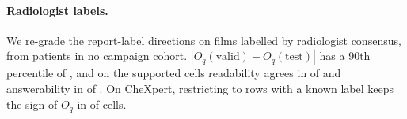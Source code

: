 \documentclass{article}
\begin{document}
\begin{table}[h]
\centering
\setlength{\tabcolsep}{3pt}
\caption{\textbf{The full grade under refitted probes.} Cells per seed-0 grade (owned, stronger competitor, unresolved, fixed-family advantage without the reference) and how many keep it under both refits, one, or none.}
\label{tab:cf-refit}
\end{table}

\paragraph{Radiologist labels.} We re-grade the report-label directions on \cfValidRows{} films labelled by radiologist consensus, from patients in no campaign cohort. $|O_q(\text{valid})-O_q(\text{test})|$ has a 90th percentile of \cfValidNinetyDO{}, and on the \cfValidSupported{} supported cells readability agrees in \cfValidReadableAgree{} of \cfValidReadableN{} and answerability in \cfValidAnswerAgree{} of \cfValidAnswerN{}. On CheXpert, restricting to rows with a known label keeps the sign of $O_q$ in \cfValKnownSignAgree{} of \cfValKnownN{} cells.
\end{document}
